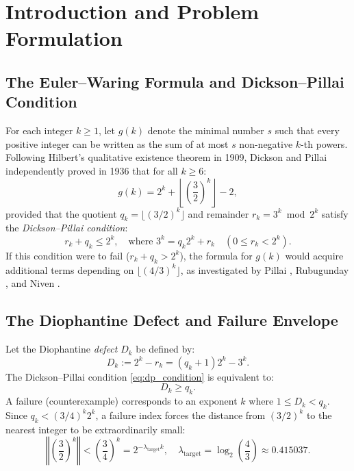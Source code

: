 \documentclass[11pt,reqno]{amsart}
\theoremstyle{definition}
\numberwithin{equation}{section}
\begin{document}
\maketitle

\tableofcontents

\section{Introduction and Problem Formulation}

\subsection{The Euler--Waring Formula and Dickson--Pillai Condition}
For each integer $k \ge 1$, let $g(k)$ denote the minimal number $s$ such that every positive integer can be written as the sum of at most $s$ non-negative $k$-th powers. Following Hilbert's qualitative existence theorem in 1909, Dickson \cite{dickson1936} and Pillai \cite{pillai1936} independently proved in 1936 that for all $k \ge 6$:
\begin{equation}\label{eq:euler_waring}
g(k) = 2^k + \left\lfloor \left(\frac{3}{2}\right)^k \right\rfloor - 2,
\end{equation}
provided that the quotient $q_k = \lfloor (3/2)^k \rfloor$ and remainder $r_k = 3^k \bmod 2^k$ satisfy the \emph{Dickson--Pillai condition}:
\begin{equation}\label{eq:dp_condition}
r_k + q_k \le 2^k, \quad \text{where } 3^k = q_k 2^k + r_k \quad (0 \le r_k < 2^k).
\end{equation}
If this condition were to fail ($r_k + q_k > 2^k$), the formula for $g(k)$ would acquire additional terms depending on $\lfloor (4/3)^k \rfloor$, as investigated by Pillai \cite{pillai1940}, Rubugunday \cite{rubugunday1942}, and Niven \cite{niven1944}.

\subsection{The Diophantine Defect and Failure Envelope}
Let the Diophantine \emph{defect} $D_k$ be defined by:
\begin{equation}\label{eq:defect_def}
D_k := 2^k - r_k = (q_k + 1)2^k - 3^k.
\end{equation}
The Dickson--Pillai condition \eqref{eq:dp_condition} is equivalent to:
\begin{equation}\label{eq:defect_ineq}
D_k \ge q_k.
\end{equation}
A failure (counterexample) corresponds to an exponent $k$ where $1 \le D_k < q_k$.
Since $q_k < (3/4)^k 2^k$, a failure index forces the distance from $(3/2)^k$ to the nearest integer to be extraordinarily small:
\begin{equation}\label{eq:target_exponent}
\left\Vert \left(\frac{3}{2}\right)^k \right\Vert < \left(\frac{3}{4}\right)^k = 2^{-\lambda_{\mathrm{target}} k}, \quad \lambda_{\mathrm{target}} = \log_2\left(\frac{4}{3}\right) \approx 0.415037.
\end{equation}
\end{document}
